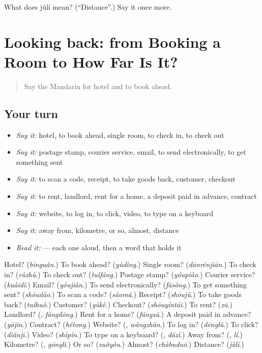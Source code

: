 \begin{tcolorbox}[breakable,colback=teal!4,colframe=teal!35!black,title={Before you move on}]
What does jùlí mean? (\textquotedblleft{}Distance\textquotedblright{}.) Say it once more.
\end{tcolorbox}
\section[(dialogue)]{Looking back: from Booking a Room to How Far Is It?}

\label{lesson:ZH-R205-review-200-205}



\begin{quote}
Say the Mandarin for hotel and to book ahead.
\end{quote}

\subsection*{Your turn}
\begin{itemize}
\raggedright
  \item \emph{Say it:} hotel, to book ahead, single room, to check in, to check out
  \item \emph{Say it:} postage stamp, courier service, email, to send electronically, to get something sent
  \item \emph{Say it:} to scan a code, receipt, to take goods back, customer, checkout
  \item \emph{Say it:} to rent, landlord, rent for a home, a deposit paid in advance, contract
  \item \emph{Say it:} website, to log in, to click, video, to type on a keyboard
  \item \emph{Say it:} away from, kilometre, or so, almost, distance
  \item \emph{Read it:}    — each one aloud, then a word that holds it
\end{itemize}

\begin{tcolorbox}[breakable,colback=teal!4,colframe=teal!35!black,title={Before you move on}]
Hotel? (\emph{bīnguǎn}.) To book ahead? (\emph{yùdìng}.) Single room? (\emph{dānrénjiān}.) To check in? (\emph{rùzhù}.) To check out? (\emph{tuìfáng}.) Postage stamp? (\emph{yóupiào}.) Courier service? (\emph{kuàidì}.) Email? (\emph{yóujiàn}.) To send electronically? (\emph{fāsòng}.) To get something sent? (\emph{shōudào}.) To scan a code? (\emph{sǎomǎ}.) Receipt? (\emph{shōujù}.) To take goods back? (\emph{tuìhuò}.) Customer? (\emph{gùkè}.) Checkout? (\emph{shōuyíntái}.) To rent? (\emph{zū}.) Landlord? (\textbf{}, \emph{fángdōng}.) Rent for a home? (\emph{fángzū}.) A deposit paid in advance? (\emph{yājīn}.) Contract? (\emph{hétong}.) Website? (\textbf{}, \emph{wǎngzhàn}.) To log in? (\emph{dēnglù}.) To click? (\emph{diǎnjī}.) Video? (\emph{shìpín}.) To type on a keyboard? (\textbf{}, \emph{dǎzì}.) Away from? (\textbf{}, \emph{lí}.) Kilometre? (\textbf{}, \emph{gōnglǐ}.) Or so? (\emph{zuǒyòu}.) Almost? (\emph{chàbuduō}.) Distance? (\emph{jùlí}.)
\end{tcolorbox}
